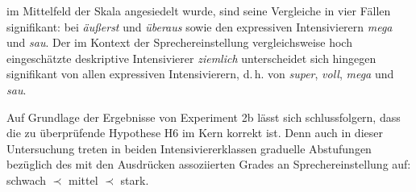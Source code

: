 im Mittelfeld der Skala angesiedelt wurde, sind seine Vergleiche in vier Fällen signifikant: bei \textit{äußerst} und \textit{überaus} sowie den expressiven Intensivierern \textit{mega} und \textit{sau}. Der im Kontext der Sprechereinstellung vergleichsweise hoch eingeschätzte deskriptive Intensivierer \textit{ziemlich} unterscheidet sich hingegen signifikant von allen expressiven Intensivierern, d.\,h. von \textit{super}, \textit{voll}, \textit{mega} und \textit{sau}.


Auf Grundlage der Ergebnisse von Experiment 2b lässt sich schlussfolgern, dass die zu überprüfende Hypothese H6 im Kern korrekt ist. Denn auch in dieser Untersuchung treten in beiden Intensiviererklassen graduelle Abstufungen bezüglich des mit den Ausdrücken assoziierten Grades an Sprechereinstellung auf: schwach $\prec$ mittel $\prec$ stark. 



%









